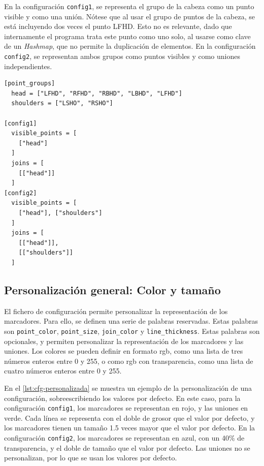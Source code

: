 En la configuración \texttt{config1}, se representa el grupo de la cabeza como un punto visible y como una unión. Nótese que al usar el grupo de puntos de la cabeza, se está incluyendo dos veces el punto \ac{LFHD}. Esto no es relevante, dado que internamente el programa trata este punto como uno solo, al usarse como clave de un \textit{Hashmap}, que no permite la duplicación de elementos. En la configuración \texttt{config2}, se representan ambos grupos como puntos visibles y como uniones independientes. 

\newpage

\begin{lstlisting}[style=mystyle, caption={Ejemplo de un grupo de puntos}, label={lst:grupos-puntos}]
[point_groups]
  head = ["LFHD", "RFHD", "RBHD", "LBHD", "LFHD"]
  shoulders = ["LSHO", "RSHO"]

[config1]
  visible_points = [
    ["head"]
  ]
  joins = [
    [["head"]]
  ]
[config2]
  visible_points = [
    ["head"], ["shoulders"]
  ]
  joins = [
    [["head"]], 
    [["shoulders"]]
  ]
\end{lstlisting}

\subsection{Personalización general: Color y tamaño}

El fichero de configuración permite personalizar la representación de los marcadores. Para ello, se definen una serie de palabras reservadas. Estas palabras son \texttt{point\_color}, \texttt{point\_size}, \texttt{join\_color} y \texttt{line\_thickness}. Estas palabras son opcionales, y permiten personalizar la representación de los marcadores y las uniones. Los colores se pueden definir en formato rgb, como una lista de tres números enteros entre 0 y 255, o como rgb con transparencia, como una lista de cuatro números enteros entre 0 y 255.

En el \autoref{lst:cfg-personalizada} se muestra un ejemplo de la personalización de una configuración, sobreescribiendo los valores por defecto. En este caso, para la configuración \texttt{config1}, los marcadores se representan en rojo, y las uniones en verde. Cada línea se representa con el doble de grosor que el valor por defecto, y los marcadores tienen un tamaño 1.5 veces mayor que el valor por defecto. En la configuración \texttt{config2}, los marcadores se representan en azul, con un 40\% de transparencia, y el doble de tamaño que el valor por defecto. Las uniones no se personalizan, por lo que se usan los valores por defecto.

